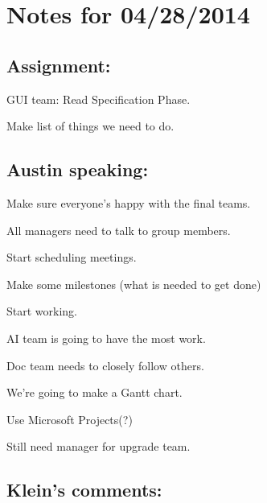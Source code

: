 \section*{Notes for 04/28/2014}

\subsection*{Assignment\+:}


\begin{DoxyEnumerate}
\item G\+U\+I team\+: Read Specification Phase.
\begin{DoxyItemize}
\item Make list of things we need to do.
\end{DoxyItemize}
\end{DoxyEnumerate}

\subsection*{Austin speaking\+:}


\begin{DoxyEnumerate}
\item Make sure everyone's happy with the final teams.
\item All managers need to talk to group members.
\begin{DoxyItemize}
\item Start scheduling meetings.
\item Make some milestones (what is needed to get done)
\item Start working.
\end{DoxyItemize}
\item A\+I team is going to have the most work.
\item Doc team needs to closely follow others.
\item We're going to make a Gantt chart.
\begin{DoxyItemize}
\item Use Microsoft Projects(?)
\end{DoxyItemize}
\item Still need manager for upgrade team.
\end{DoxyEnumerate}

\subsection*{Klein's comments\+:}


